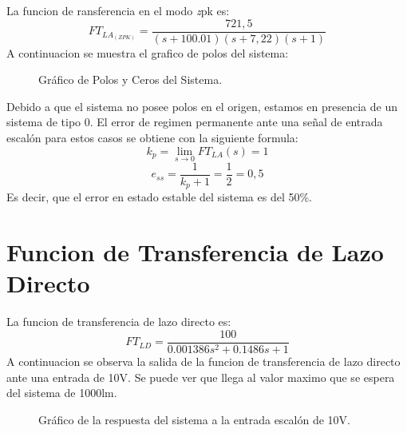 \documentclass[a4paper,11pt]{article}
\begin{document}
La funcion de ransferencia en el modo \emph zpk es:
$$FT_{LA_{(ZPK)}}=\frac{721,5}{(s + 100.01)(s + 7,22)(s + 1)}$$
A continuacion se muestra el grafico de polos del sistema:
  \begin{figure}[H] %
	\caption{Gráfico de Polos y Ceros del Sistema.}
	\label{fig:cp1}
	\end{figure} 
Debido a que el sistema no posee polos en el origen, estamos en presencia de un sistema de tipo 0. El error de regimen permanente ante una señal de entrada escalón para estos casos se obtiene con la siguiente formula:
$$k_p=\lim\limits_{s\rightarrow 0}FT_{LA}(s) = 1$$
$$e_{ss}=\frac{1}{k_p+1}=\frac{1}{2}=0,5 $$
Es decir, que el error en estado estable del sistema es del 50\%.
\section{Funcion de Transferencia de Lazo Directo}
La funcion de transferencia de lazo directo es:
$$FT_{LD}=\frac{100}{0.001386s^2 + 0.1486 s + 1}$$
A continuacion se observa la salida de la funcion de transferencia de lazo directo ante una entrada de 10V. Se puede ver que llega al valor maximo que se espera del sistema de 1000lm.
  \begin{figure}[H] %
	\caption{Gráfico de la respuesta del sistema a la entrada escalón de 10V.}
	\label{fig:resp_esc1}
	\end{figure} 
\end{document}
